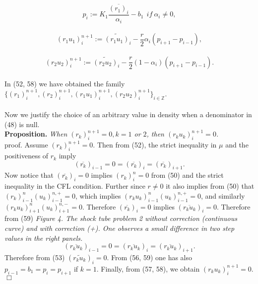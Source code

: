 \documentclass[a4paper,12pt]{article}
\begin{document}
\begin{equation} p_i:=K_1\frac{  \overline{(r_1)_i}  } {  \alpha_i  }-b_1 \ \  if \  \alpha_i\not=0,\end{equation}
\\
\begin{equation} (r_1u_1)_i^{n+1}:=\widetilde{ (r_1u_1)}_i-\frac{r}{2} \alpha_i(p_{i+1}-p_{i-1}),\end{equation}
\\
\begin{equation} (r_2u_2)_i^{n+1}:=\widetilde{ (r_2u_2)}_i-\frac{r}{2} (1-\alpha_i)(p_{i+1}-p_{i-1}).\end{equation}
\  \  \\
In (52, 58) we have obtained  the family   $\{(r_1)_i^{n+1},(r_2)_i^{n+1},(r_1u_1)_i^{n+1},(r_2u_2)_i^{n+1}\}_{i\in\mathbb{Z}}$.\\
 \\

Now we justify the choice of an arbitrary value in density when a denominator in (48) is null.\\

\textbf{Proposition.} 
\textit{When $(r_k)_i^{n+1}=0,  k=1$ or $2$,  then  $(r_ku_k)_i^{n+1}=0$. }\\

proof.
Assume $(r_k)_i^{n+1}=0$.   Then from (52), the strict inequality in $\mu$ and the positiveness of $r_k$ imply
 \begin{equation}(\overline{r_k})_{i-1}=0=(\overline{r_k})_{i}=(\overline{r_k})_{i+1}.\end{equation} 
 Now notice that $(\overline{ r_k})_i=0$ implies $(r_k)_i^n=0$ from (50) and the strict inequality in the CFL condition.  Further since $r\not=0$ it also implies from (50) that $ (r_k)_{i-1}^n(u_k)_{i-1}^{n,+}=0$, which implies $ (r_k u_k)_{i-1}^n(u_k)_{i-1}^{n,+}=0$, and  similarly
$ (r_k u_k)_{i+1}^n(u_k)_{i+1}^{n,-}=0$. Therefore $(\overline{r_k})_i=0$ implies  $(\overline{r_ku_k})_i=0$. Therefore from (59) 
\vskip10cm
\textit{Figure 4. The shock tube problem 2 without correction (continuous curve) and with correction (+). One observes a small difference in two step values in the right panels.}
 \begin{equation}(\overline{r_ku_k})_{i-1}=0=(\overline{r_ku_k})_{i}=(\overline{r_ku_k})_{i+1}. \end{equation}  
Therefore  from (53) $ (\widetilde{r_ku_k})_i=0$.  From (56, 59) one has also $p_{i-1}=b_1=p_{i}=p_{i+1}$ if $k=1$. Finally, from (57, 58), we obtain $(r_ku_k)_i^{n+1}=0$. $\Box$\\
\end{document}
